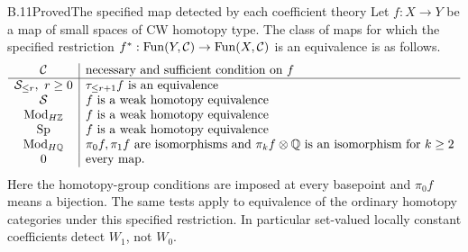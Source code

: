 \begin{statement}{B.11}{Proved}{The specified map detected by each coefficient theory}
Let $f:X\to Y$ be a map of small spaces of CW homotopy type. The class
of maps for which the specified restriction
$f^*:\operatorname{Fun}(Y,\mathcal C)\to\operatorname{Fun}(X,\mathcal C)$ is an equivalence is as follows.
\[
\begin{array}{c|l}
 \mathcal C & \text{necessary and sufficient condition on }f\\\hline
 \mathcal S_{\leq r},\ r\geq0 & \tau_{\leq r+1}f\text{ is an equivalence}\\
 \mathcal S & f\text{ is a weak homotopy equivalence}\\
 \operatorname{Mod}_{H\mathbb Z} & f\text{ is a weak homotopy equivalence}\\
 \operatorname{Sp} & f\text{ is a weak homotopy equivalence}\\
 \operatorname{Mod}_{H\mathbb Q} &
 \pi_0f,\pi_1f\text{ are isomorphisms and }
 \pi_kf\otimes\mathbb Q\text{ is an isomorphism for }k\geq2\\
 0 & \text{every map.}
\end{array}
\]
Here the homotopy-group conditions are imposed at every basepoint and
$\pi_0f$ means a bijection. The same tests apply to equivalence of the
ordinary homotopy categories under this specified restriction. In
particular set-valued locally constant coefficients detect $W_1$, not
$W_0$.
\end{statement}
